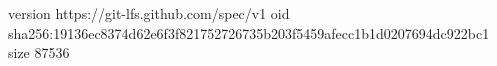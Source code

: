version https://git-lfs.github.com/spec/v1
oid sha256:19136ec8374d62e6f3f821752726735b203f5459afecc1b1d0207694dc922bc1
size 87536
